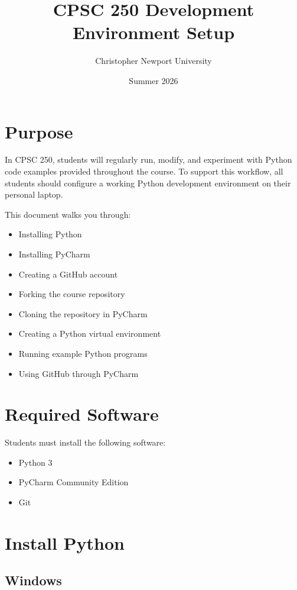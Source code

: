 \documentclass[11pt]{article}
\title{CPSC 250 Development Environment Setup}
\author{Christopher Newport University}
\date{Summer 2026}
\begin{document}
\maketitle

\section{Purpose}

In CPSC 250, students will regularly run, modify, and experiment with Python code examples provided throughout the course. To support this workflow, all students should configure a working Python development environment on their personal laptop.

This document walks you through:

\begin{itemize}
    \item Installing Python
    \item Installing PyCharm
    \item Creating a GitHub account
    \item Forking the course repository
    \item Cloning the repository in PyCharm
    \item Creating a Python virtual environment
    \item Running example Python programs
    \item Using GitHub through PyCharm
\end{itemize}

\section{Required Software}

Students must install the following software:

\begin{itemize}
    \item Python 3
    \item PyCharm Community Edition
    \item Git
\end{itemize}

\section{Install Python}

\subsection{Windows}
\end{document}
